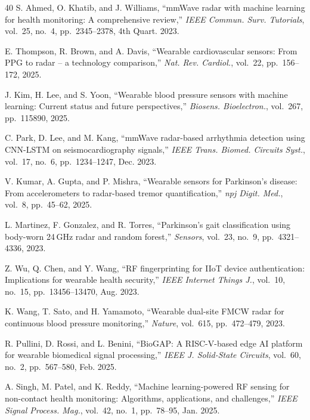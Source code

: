 \documentclass[journal,twoside]{IEEEtran}
\begin{document}
\begin{thebibliography}{40}
S. Ahmed, O. Khatib, and J. Williams, ``mmWave radar with machine learning for health monitoring: A comprehensive review,'' \textit{IEEE Commun. Surv. Tutorials}, vol.~25, no.~4, pp.~2345--2378, 4th Quart. 2023.

E. Thompson, R. Brown, and A. Davis, ``Wearable cardiovascular sensors: From PPG to radar -- a technology comparison,'' \textit{Nat. Rev. Cardiol.}, vol.~22, pp.~156--172, 2025.

J. Kim, H. Lee, and S. Yoon, ``Wearable blood pressure sensors with machine learning: Current status and future perspectives,'' \textit{Biosens. Bioelectron.}, vol.~267, pp.~115890, 2025.

C. Park, D. Lee, and M. Kang, ``mmWave radar-based arrhythmia detection using CNN-LSTM on seismocardiography signals,'' \textit{IEEE Trans. Biomed. Circuits Syst.}, vol.~17, no.~6, pp.~1234--1247, Dec. 2023.

V. Kumar, A. Gupta, and P. Mishra, ``Wearable sensors for Parkinson's disease: From accelerometers to radar-based tremor quantification,'' \textit{npj Digit. Med.}, vol.~8, pp.~45--62, 2025.

L. Martinez, F. Gonzalez, and R. Torres, ``Parkinson's gait classification using body-worn 24\,GHz radar and random forest,'' \textit{Sensors}, vol.~23, no.~9, pp.~4321--4336, 2023.

Z. Wu, Q. Chen, and Y. Wang, ``RF fingerprinting for IIoT device authentication: Implications for wearable health security,'' \textit{IEEE Internet Things J.}, vol.~10, no.~15, pp.~13456--13470, Aug. 2023.

K. Wang, T. Sato, and H. Yamamoto, ``Wearable dual-site FMCW radar for continuous blood pressure monitoring,'' \textit{Nature}, vol.~615, pp.~472--479, 2023.

R. Pullini, D. Rossi, and L. Benini, ``BioGAP: A RISC-V-based edge AI platform for wearable biomedical signal processing,'' \textit{IEEE J. Solid-State Circuits}, vol.~60, no.~2, pp.~567--580, Feb. 2025.

A. Singh, M. Patel, and K. Reddy, ``Machine learning-powered RF sensing for non-contact health monitoring: Algorithms, applications, and challenges,'' \textit{IEEE Signal Process. Mag.}, vol.~42, no.~1, pp.~78--95, Jan. 2025.


\end{thebibliography}
\end{document}
